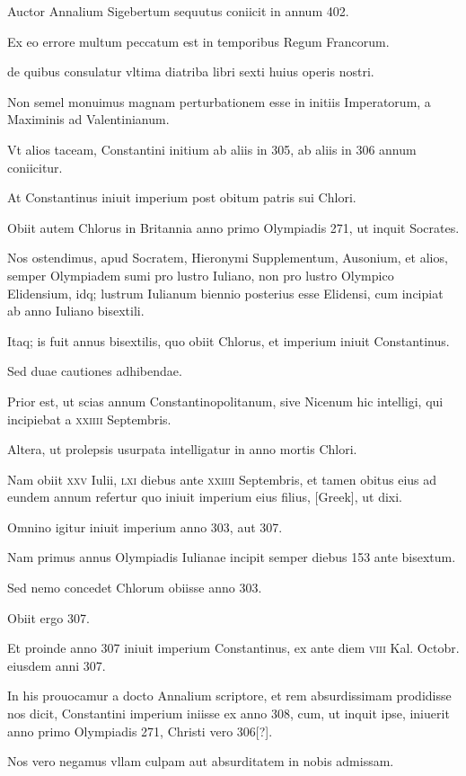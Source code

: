 \begin{parnumbers}
Auctor Annalium Sigebertum
sequutus coniicit in annum 402.

Ex eo errore multum peccatum
est in temporibus Regum Francorum.

de quibus consulatur vltima
diatriba libri sexti huius operis nostri.

Non semel monuimus magnam
perturbationem esse in initiis Imperatorum, a Maximinis
ad Valentinianum.

Vt alios taceam, Constantini initium ab aliis in
305, ab aliis in 306 annum coniicitur.

At Constantinus iniuit imperium
post obitum patris sui Chlori.

Obiit autem Chlorus in Britannia
anno primo Olympiadis 271, ut inquit Socrates.

Nos ostendimus,
apud Socratem, Hieronymi Supplementum, Ausonium, et alios,
semper Olympiadem sumi pro lustro Iuliano, non pro lustro Olympico
Elidensium, idq; lustrum Iulianum biennio posterius esse Elidensi,
cum incipiat ab anno Iuliano bisextili.

Itaq; is fuit annus bisextilis,
quo obiit Chlorus, et imperium iniuit Constantinus.

Sed duae
cautiones adhibendae.

Prior est, ut scias annum Constantinopolitanum,
sive Nicenum hic intelligi, qui incipiebat a \textsc{xxiiii} Septembris.

Altera, ut prolepsis usurpata intelligatur in anno mortis Chlori.

Nam obiit \textsc{xxv} Iulii, \textsc{lxi} diebus ante
\textsc{xxiiii} Septembris, et
tamen obitus eius ad eundem annum refertur quo iniuit imperium
eius filius, \textgreek{[Greek]}, ut dixi.

Omnino igitur iniuit imperium anno
303, aut 307.

Nam primus annus Olympiadis Iulianae incipit semper
diebus 153 ante bisextum.

Sed nemo concedet Chlorum obiisse
anno 303.

Obiit ergo 307.

Et proinde anno 307 iniuit imperium
Constantinus, ex ante diem \textsc{viii} Kal. Octobr. eiusdem anni 307.

In his prouocamur a docto Annalium scriptore, et rem absurdissimam
prodidisse nos dicit, Constantini imperium iniisse ex anno
308, cum, ut inquit ipse, iniuerit anno primo Olympiadis 271,
Christi vero 306[?].

Nos vero negamus vllam culpam aut absurditatem
in nobis admissam.


\end{parnumbers}
